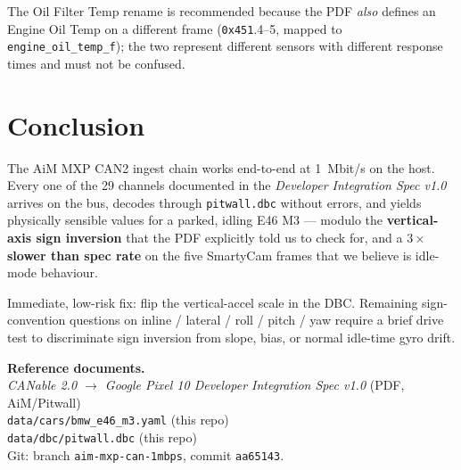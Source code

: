 \documentclass[11pt,a4paper]{article}
\newcommand{\hex}[1]{\texttt{0x#1}}
\begin{document}
The Oil Filter Temp rename is recommended because the PDF
\emph{also} defines an Engine Oil Temp on a different frame
(\hex{451}.4--5, mapped to \texttt{engine\_oil\_temp\_f}); the
two represent different sensors with different response times and
must not be confused.

\section{Conclusion}

The AiM MXP CAN2 ingest chain works end-to-end at \SI{1}{Mbit/s} on
the host. Every one of the 29 channels documented in the
\emph{Developer Integration Spec v1.0} arrives on the bus, decodes
through \texttt{pitwall.dbc} without errors, and yields physically
sensible values for a parked, idling E46 M3 --- modulo the
\textbf{vertical-axis sign inversion} that the PDF explicitly told
us to check for, and a \textbf{$3\times$ slower than spec rate} on
the five SmartyCam frames that we believe is idle-mode behaviour.

Immediate, low-risk fix: flip the vertical-accel scale in the DBC.
Remaining sign-convention questions on inline / lateral / roll /
pitch / yaw require a brief drive test to discriminate sign
inversion from slope, bias, or normal idle-time gyro drift.

\vspace{1em}

\noindent\textbf{Reference documents.}\\
\hspace*{1em}\textit{CANable 2.0 $\to$ Google Pixel 10 Developer Integration Spec v1.0} (PDF, AiM/Pitwall)\\
\hspace*{1em}\texttt{data/cars/bmw\_e46\_m3.yaml} (this repo)\\
\hspace*{1em}\texttt{data/dbc/pitwall.dbc} (this repo)\\
\hspace*{1em}Git: branch \texttt{aim-mxp-can-1mbps}, commit \texttt{aa65143}.
\end{document}
